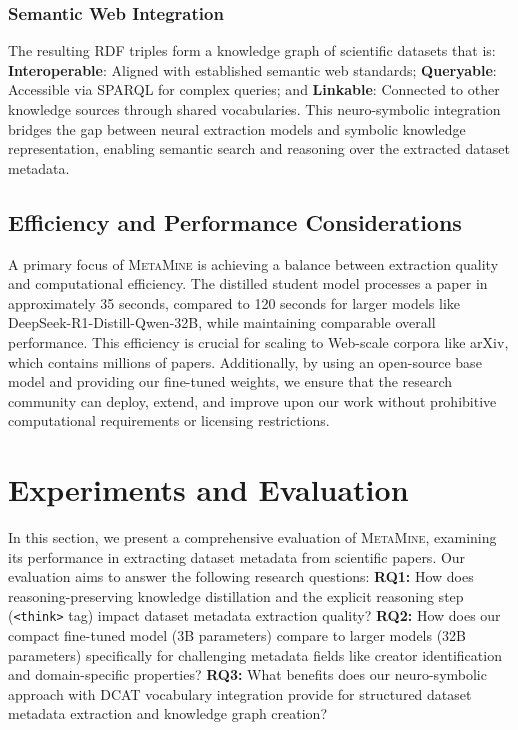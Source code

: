 \documentclass[runningheads]{llncs}
\begin{document}
\subsubsection{Semantic Web Integration}
The resulting RDF triples form a knowledge graph of scientific datasets that is:
     \textbf{Interoperable}: Aligned with established semantic web standards;
     \textbf{Queryable}: Accessible via SPARQL for complex queries; and
     \textbf{Linkable}: Connected to other knowledge sources through shared vocabularies.
This neuro-symbolic integration bridges the gap between neural extraction models and symbolic knowledge representation, enabling semantic search and reasoning over the extracted dataset metadata.

\subsection{Efficiency and Performance Considerations}
A primary focus of \textsc{MetaMine} is achieving a balance between extraction quality and computational efficiency. The distilled student model processes a paper in approximately 35 seconds, compared to 120 seconds for larger models like DeepSeek-R1-Distill-Qwen-32B, while maintaining comparable overall performance. This efficiency is crucial for scaling to Web-scale corpora like arXiv, which contains millions of papers. Additionally, by using an open-source base model and providing our fine-tuned weights, we ensure that the research community can deploy, extend, and improve upon our work without prohibitive computational requirements or licensing restrictions.

\section{Experiments and Evaluation}
\label{sec:experimental_setup}
In this section, we present a comprehensive evaluation of \textsc{MetaMine}, examining its performance in extracting dataset metadata from scientific papers. Our evaluation aims to answer the following research questions:
     \textbf{RQ1:} How does reasoning-preserving knowledge distillation and the explicit reasoning step (\texttt{<think>} tag) impact dataset metadata extraction quality?
     \textbf{RQ2:} How does our compact fine-tuned model (3B parameters) compare to larger models (32B parameters) specifically for challenging metadata fields like creator identification and domain-specific properties?
     \textbf{RQ3:} What benefits does our neuro-symbolic approach with DCAT vocabulary integration provide for structured dataset metadata extraction and knowledge graph creation?
\end{document}
